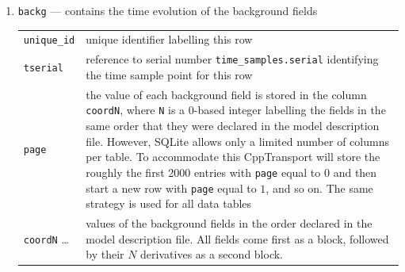 \documentclass[11pt,a4paper]{article}
\newcommand{\packagefont}{\sffamily}
\newcommand{\CppTransport}{{\packagefont CppTransport}}
\newcommand{\SQLite}{{\packagefont SQLite}}
\newenvironment{sqltablelist}{\renewcommand{\arraystretch}{1.3}\small}{}
\begin{document}
\begin{sqltablelist}
\begin{enumerate}
    \item \texttt{backg} --- contains the time evolution of the background fields \\
    \label{sqltable:backg}
    \begin{tabular}{p{2.5cm}p{11.2cm}}
        \texttt{unique_id} & unique identifier labelling this row \\
        \texttt{tserial} & reference to serial number
        \texttt{time_samples.serial} identifying the time sample
        point for this row \\
        \texttt{page} & the value of each background field is stored in the column
        \texttt{coordN}, where \texttt{N} is a 0-based integer
        labelling the fields in the same order that they were declared in
        the model description file. However, {\SQLite} allows only a limited number
        of columns per table. To accommodate this {\CppTransport} will store the roughly
        the first 2000 entries with \texttt{page} equal to $0$ and then
        start a new row with \texttt{page} equal to $1$, and so on.
        The same strategy is used for all data tables \\
        \texttt{coordN} \ldots & values of the background fields in the order
        declared in the model description file.
        All fields come first as a block, followed by their $N$ derivatives as a second block.
    \end{tabular}


\end{enumerate}
\end{sqltablelist}
\end{document}
